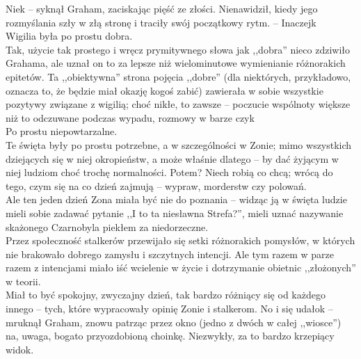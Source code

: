 \documentclass[../MAIN.tex]{subfiles}
\begin{document}
\sx Nie\3k -- syknął Graham, zaciskając pięść ze złości.
\qd
Nienawidził, kiedy jego rozmyślania szły w złą stronę i traciły swój początkowy rytm. -- Inaczej\3k\\
Wigilia była po prostu dobra.\\
Tak, użycie tak prostego i wręcz prymitywnego słowa jak ,,dobra'' nieco zdziwiło Grahama, ale uznał on to za lepsze niż wielominutowe wymienianie różnorakich epitetów. Ta ,,obiektywna'' strona pojęcia ,,dobre'' (dla niektórych, przykładowo, oznacza to, że będzie miał okazję kogoś zabić) zawierała w sobie wszystkie pozytywy związane z wigilią; choć nikłe, to zawsze -- poczucie wspólnoty większe niż to odczuwane podczas wypadu, rozmowy w barze czy\3k\\
Po prostu niepowtarzalne.\\
Te święta były po prostu potrzebne, a w szczególności w Zonie; mimo wszystkich dziejących się w niej okropieństw, a może właśnie dlatego -- by dać żyjącym w niej ludziom choć trochę normalności. Potem? Niech robią co chcą; wrócą do tego, czym się na co dzień zajmują -- wypraw, morderstw czy polowań.\\
Ale ten jeden dzień Zona miała być nie do poznania -- widząc ją w święta ludzie mieli sobie zadawać pytanie ,,I to ta niesławna Strefa?'', mieli uznać nazywanie skażonego Czarnobyla piekłem za niedorzeczne.\\
Przez społeczność stalkerów przewijało się setki różnorakich pomysłów, w których nie brakowało dobrego zamysłu i szczytnych intencji. Ale tym razem w parze razem z intencjami miało iść wcielenie w życie i dotrzymanie obietnic ,,złożonych'' w teorii.\\
Miał to być spokojny, zwyczajny dzień, tak bardzo różniący się od każdego innego -- tych, które wypracowały opinię Zonie i stalkerom.
\sx No i się udało\3k -- mruknął Graham, znowu patrząc przez okno (jedno z dwóch w całej ,,wiosce'') na, uwaga, bogato przyozdobioną choinkę.
\qd
Niezwykły, za to bardzo krzepiący widok.
\end{document}
